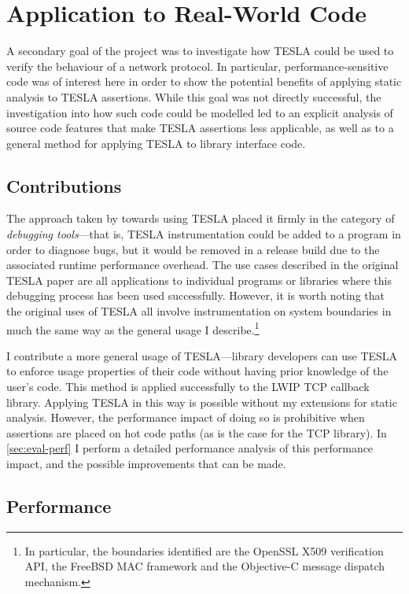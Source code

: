 \section{Application to Real-World Code} \label{sec:eval-app}

A secondary goal of the project was to investigate how TESLA could be used to
verify the behaviour of a network protocol. In particular, performance-sensitive
code was of interest here in order to show the potential benefits of applying
static analysis to TESLA assertions. While this goal was not directly
successful, the investigation into how such code could be modelled led to an
explicit analysis of source code features that make TESLA assertions less
applicable, as well as to a general method for applying TESLA to library
interface code.

\subsection{Contributions}

The approach taken by \textcite{anderson_tesla:_2014} towards using TESLA placed
it firmly in the category of \emph{debugging tools}---that is, TESLA
instrumentation could be added to a program in order to diagnose bugs, but it
would be removed in a release build due to the associated runtime performance
overhead. The use cases described in the original TESLA paper are all
applications to individual programs or libraries where this debugging process
has been used successfully. However, it is worth noting that the original uses
of TESLA all involve instrumentation on system boundaries in much the same way
as the general usage I describe.\footnote{In particular, the boundaries
identified are the OpenSSL X509 verification API, the FreeBSD MAC framework and
the Objective-C message dispatch mechanism.}

I contribute a more general usage of TESLA---library developers can use TESLA to
enforce usage properties of their code without having prior knowledge of the
user's code. This method is applied successfully to the LWIP TCP callback
library. Applying TESLA in this way is possible without my extensions for static
analysis. However, the performance impact of doing so is prohibitive when
assertions are placed on hot code paths (as is the case for the TCP
library). In \autoref{sec:eval-perf} I perform a detailed performance analysis
of this performance impact, and the possible improvements that can be made.

\subsection{Performance} \label{sec:eval-perf}

